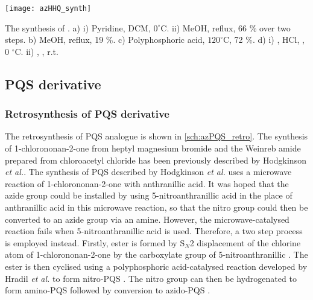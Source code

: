 \begin{scheme}[H]
	\begin{center}
		\texttt{[image: azHHQ\_synth]}
		\caption{The synthesis of . 
		a) i) Pyridine, DCM, $0 ^{\circ}$C. ii) MeOH, reflux, 66 \% over two steps. 
		b) MeOH, reflux, 19 \%. 
		c) Polyphosphoric acid, $120 ^{\circ}$C, 72 \%. 
		d) i) , HCl, , 0 $^{\circ}$C. ii) , , r.t. 
		\label{sch:azHHQ_synth}}
	\end{center}
\end{scheme}

\subsection{PQS derivative}

\subsubsection{Retrosynthesis of PQS derivative }

The retrosynthesis of PQS analogue  is shown in \ref{sch:azPQS_retro}. The synthesis of 1-chlorononan-2-one  from heptyl magnesium bromide \cite{Hodgkinson2012} and the Weinreb amide \cite{Hodgkinson2011} prepared from chloroacetyl chloride  has been previously described by Hodgkinson \textit{et al.}\cite{Hodgkinson2012}. 
The synthesis of PQS described by Hodgkinson \textit{et al.}\cite{Hodgkinson2012} uses a microwave reaction of 1-chlorononan-2-one  with anthranillic acid. It was hoped that the azide group could be installed by using 5-nitroanthranillic acid  in the place of anthranillic acid in this microwave reaction, so that the nitro group could then be converted to an azide group via an amine. However, the microwave-catalysed reaction fails when 5-nitroanthranillic acid  is used\cite{Baker2014}. Therefore, a two step process is employed instead. Firstly, ester  is formed by S$_N$2 displacement of the chlorine atom of 1-chlorononan-2-one  by the carboxylate group of 5-nitroanthranillic . The ester  is then cyclised using a polyphosphoric acid-catalysed reaction developed by Hradil \textit{et al.}\cite{Hradil1999} to form nitro-PQS . The nitro group can then be hydrogenated to form amino-PQS  followed by conversion to azido-PQS \cite{Xu2013}.


